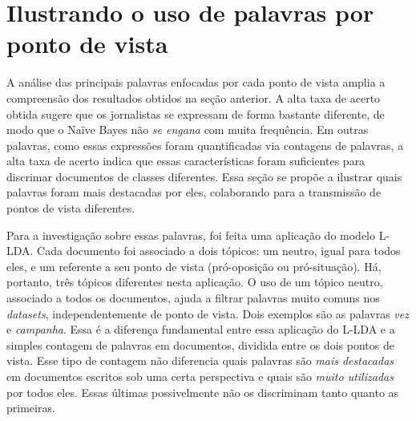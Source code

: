 

\section{Ilustrando o uso de palavras por ponto de vista}
\label{estudo:sec3}

A análise das principais palavras enfocadas por cada ponto de vista amplia a compreensão dos resultados obtidos na seção anterior. A alta taxa de acerto obtida sugere que os jornalistas se expressam de forma bastante diferente, de modo que o Naïve Bayes não \emph{se engana} com muita frequência. Em outras palavras, como essas expressões foram quantificadas via contagens de palavras, a alta taxa de acerto indica que essas características foram suficientes para discrimar documentos de classes diferentes. Essa seção se propõe a ilustrar quais palavras foram mais destacadas por eles, colaborando para a transmissão de pontos de vista diferentes.

Para a investigação sobre essas palavras, foi feita uma aplicação do modelo L-LDA. Cada documento foi associado a dois tópicos: um neutro, igual para todos eles, e um referente a seu ponto de vista (pró-oposição ou pró-situação). Há, portanto, três tópicos diferentes nesta aplicação. O uso de um tópico neutro, associado a todos os documentos, ajuda a filtrar palavras muito comuns nos \emph{datasets}, independentemente de ponto de vista. Dois exemplos são as palavras \emph{vez} e \emph{campanha}. Essa é a diferença fundamental entre essa aplicação do L-LDA e a simples contagem de palavras em documentos, dividida entre os dois pontos de vista. Esse tipo de contagem não diferencia quais palavras são \emph{mais destacadas} em documentos escritos sob uma certa perspectiva e quais são \emph{muito utilizadas} por todos eles. Essas últimas possivelmente não os discriminam tanto quanto as primeiras.




